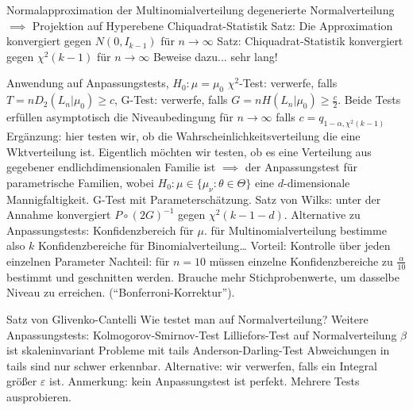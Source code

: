 \begin{outline}
\1 Normalapproximation der Multinomialverteilung
    \2 degenerierte Normalverteilung $\implies$ Projektion auf Hyperebene
\1 Chiquadrat-Statistik
\1 Satz: Die Approximation konvergiert gegen $N(0,I_{k-1})$ für $n\to\infty$
\1 Satz: Chiquadrat-Statistik konvergiert gegen $\chi^2(k-1)$ für $n\to\infty$
\0 Beweise dazu... sehr lang!

    \1 Anwendung auf Anpassungstests, $H_0 : \mu = \mu_0$
        \2 $\chi^2$-Test: verwerfe, falls $T=n D_2(L_n | \mu_0) \geq c$,
        \2 G-Test: verwerfe, falls $G=nH(L_n | \mu_0) \geq \frac{c}{2}$.
        \2 Beide Tests erfüllen asymptotisch die Niveaubedingung für $n\to\infty$ falls $c=q_{1-\alpha, \chi^2(k-1)}$
\0 Ergänzung: hier testen wir, ob die Wahrscheinlichkeitsverteilung die eine Wktverteilung ist. Eigentlich möchten wir testen, ob es eine Verteilung aus gegebener endlichdimensionalen Familie ist $\implies$ der Anpassungstest für parametrische Familien, wobei $H_0 : \mu \in \{\mu_\nu : \theta \in \Theta\}$ eine $d$-dimensionale Mannigfaltigkeit. G-Test mit Parameterschätzung. Satz von Wilks: unter der Annahme konvergiert $P\circ (2G)^{-1}$ gegen $\chi^2(k-1-d)$.
    \1 Alternative zu Anpassungstests: Konfidenzbereich für $\mu$.
        \2 für Multinomialverteilung bestimme also $k$ Konfidenzbereiche für Binomialverteilung\ldots
        \2 Vorteil: Kontrolle über jeden einzelnen Parameter
        \2 Nachteil: für $n=10$ müssen einzelne Konfidenzbereiche zu $\frac{\alpha}{10}$ bestimmt und geschnitten werden. Brauche mehr Stichprobenwerte, um dasselbe Niveau zu erreichen. (\enquote{Bonferroni-Korrektur}).
\end{outline}


\begin{outline}
    \1 Satz von Glivenko-Cantelli
    \1 Wie testet man auf Normalverteilung? Weitere Anpassungstests:
        \2 Kolmogorov-Smirnov-Test
        \2 Lilliefors-Test auf Normalverteilung
            \3 $\beta$ ist skaleninvariant
            \3 Probleme mit tails
        \2 Anderson-Darling-Test
        \2 Abweichungen in tails sind nur schwer erkennbar. Alternative: wir verwerfen, falls ein Integral größer $\varepsilon$ ist.
\0 Anmerkung: kein Anpassungstest ist perfekt. Mehrere Tests ausprobieren.
\end{outline}

